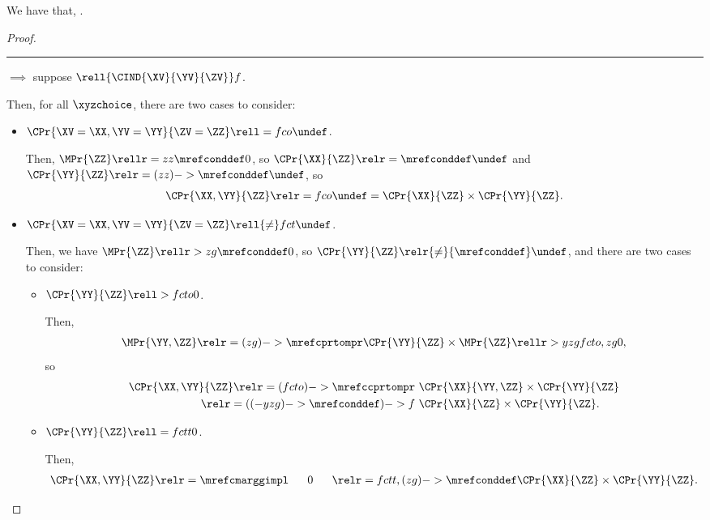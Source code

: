 \begin{proposition}
  We have that, \indproddefa.%
\end{proposition}

\begin{proof}
  \hrule
  $\implies$ suppose $\rell {\CIND{\XV}{\YV}{\ZV}} f $.

  Then, for all $\xyzchoice$, there are two cases to consider:
  \begin{itemize}
    \item {} $\CPr{\XV = \XX, \YV = \YY}{\ZV = \ZZ} \rell = fco \undef$.

      Then, 
      $\MPr{\ZZ} \rellr = zz {\mrefconddef} 0$,
      so
      $\CPr{\XX}{\ZZ} \relr = {\mrefconddef} \undef$
      and
      $\CPr{\YY}{\ZZ} \relr = {(zz)->\mrefconddef} \undef$, so
      \begin{align*}
        \CPr{\XX, \YY}{\ZZ}  \relr = fco \undef =
        \CPr{\XX}{\ZZ} \times \CPr{\YY}{\ZZ}.
      \end{align*}
    \item {} $\CPr{\XV = \XX, \YV = \YY}{\ZV = \ZZ} \rell {\ne} fct \undef$.

      Then, we have $\MPr{\ZZ} \rellr > zg {\mrefconddef} 0$, so $\CPr{\YY}{\ZZ} \relr {\ne} {\mrefconddef} \undef$, and there are two cases to consider:
      \begin{itemize}
        \item {} $\CPr{\YY}{\ZZ} \rell > fcto 0$.

        Then,
        \begin{align*}
          \MPr{\YY, \ZZ} \relr = {(zg)->\mrefcprtompr}
          \CPr{\YY}{\ZZ} \times \MPr{\ZZ} \rellr > yzg {fcto,zg} 0,
        \end{align*}
        so
        \begin{align*}
          \CPr{\XX, \YY}{\ZZ} 
          \relr = {(fcto)->\mrefccprtompr} &\ \CPr{\XX}{\YY, \ZZ} \times \CPr{\YY}{\ZZ}\\
          \relr = {((-yzg)->\mrefconddef)->f} &\ \CPr{\XX}{\ZZ} \times \CPr{\YY}{\ZZ}.
        \end{align*}

        \item {} $\CPr{\YY}{\ZZ} \rell = {fctt} 0$.

        Then,
        \begin{align*}
          \CPr{\XX, \YY}{\ZZ} \relr = {\mrefcmarggimpl} \ \ \ \ \ 0\ \ \ \ \  
          \relr = {fctt,(zg)->\mrefconddef} \CPr{\XX}{\ZZ} \times \CPr{\YY}{\ZZ}.
        \end{align*}
      \end{itemize}
  \end{itemize}


\end{proof}

